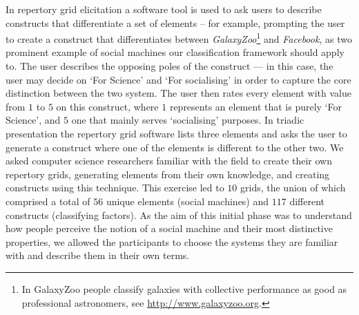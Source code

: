 \documentclass{sig-alternate}
\begin{document}
In repertory grid elicitation a software tool is used to ask users to describe constructs
that differentiate a set of elements -- for example, prompting the user to create a construct that
differentiates between {\it GalaxyZoo}\footnote{In GalaxyZoo people classify galaxies with collective performance as good as professional astronomers, see \url{http://www.galaxyzoo.org}.} and {\it Facebook}, as two prominent example of social machines our classification framework should apply to. The user describes the opposing poles of the construct --- in this case, the user may decide on `For Science' and `For socialising' in order to capture the core distinction between the two system. The user then rates every element with value from $1$ to $5$ on this construct, where $1$ represents an element that is purely `For Science', and $5$ one that mainly serves `socialising' purposes. In triadic presentation the repertory grid software lists three elements and asks the user to generate a construct where one of the elements is different to the other two. We asked computer science researchers familiar with the field to create their own repertory grids, generating elements from their own knowledge, and creating constructs using this technique. This exercise led to $10$ grids, the union of which comprised a total of $56$ unique elements (social machines)
and $117$ different constructs (classifying factors). As the aim of this initial phase was to understand how people perceive the notion of a social machine and their most distinctive properties, we allowed the participants to choose the systems they are familiar with and describe them in their own terms.

\end{document}
